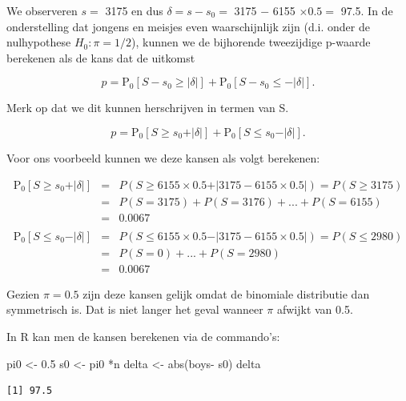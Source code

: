 \documentclass[
  dutch,
  letterpaper,
  12pt]{book}
\newenvironment{Shaded}{\begin{snugshade}}{\end{snugshade}}
\newcommand{\FloatTok}[1]{\textcolor[rgb]{0.68,0.00,0.00}{#1}}
\newcommand{\FunctionTok}[1]{\textcolor[rgb]{0.28,0.35,0.67}{#1}}
\newcommand{\NormalTok}[1]{\textcolor[rgb]{0.00,0.23,0.31}{#1}}
\newcommand{\OtherTok}[1]{\textcolor[rgb]{0.00,0.23,0.31}{#1}}
\newcommand{\SpecialCharTok}[1]{\textcolor[rgb]{0.37,0.37,0.37}{#1}}
\theoremstyle{definition}
\theoremstyle{definition}
\theoremstyle{definition}
\theoremstyle{remark}
\begin{document}
We observeren \(s=\) 3175 en dus \(\delta=s-s_0=\) 3175 \(-\) 6155
\(\times 0.5=\) 97.5. In de onderstelling dat jongens en meisjes even
waarschijnlijk zijn (d.i. onder de nulhypothese \(H_0:\pi=1/2\)), kunnen
we de bijhorende tweezijdige p-waarde berekenen als de kans dat de
uitkomst

\[p=\text{P}_0\left[S-s_0\geq \vert \delta\vert \right] + \text{P}_0\left[S-s_0\leq - \vert \delta\vert \right].\]

Merk op dat we dit kunnen herschrijven in termen van S.

\[p=\text{P}_0\left[S\geq s_0+ \vert \delta\vert \right] + \text{P}_0\left[S \leq s_0 - \vert \delta\vert \right].\]

Voor ons voorbeeld kunnen we deze kansen als volgt berekenen:

\begin{eqnarray*}
\text{P}_0\left[S\geq s_0+ \vert \delta\vert \right] &=& P(S \geq 6155 \times 0.5 + \vert 3175 - 6155 \times 0.5\vert ) = P(S \geq 3175)\\
&= &P(S= 3175) + P(S=3176) + ... + P(S=6155)\\
& =& 0.0067\\\\
\text{P}_0\left[S \leq s_0 - \vert \delta\vert \right] &=& P(S \leq  6155 \times 0.5 - \vert 3175- 6155 \times 0.5\vert) = P(S \leq 2980)\\ &= &P(S=0) + ... + P(S=2980) \\
&=&0.0067
\end{eqnarray*}

Gezien \(\pi=0.5\) zijn deze kansen gelijk omdat de binomiale
distributie dan symmetrisch is. Dat is niet langer het geval wanneer
\(\pi\) afwijkt van 0.5.

In R kan men de kansen berekenen via de commando's:

\begin{Shaded}
\begin{Highlighting}[]
\NormalTok{pi0 }\OtherTok{\textless{}{-}} \FloatTok{0.5}
\NormalTok{s0 }\OtherTok{\textless{}{-}}\NormalTok{ pi0 }\SpecialCharTok{*}\NormalTok{n}
\NormalTok{delta }\OtherTok{\textless{}{-}} \FunctionTok{abs}\NormalTok{(boys}\SpecialCharTok{{-}}\NormalTok{ s0)}
\NormalTok{delta}
\end{Highlighting}
\end{Shaded}

\begin{verbatim}
[1] 97.5
\end{verbatim}
\end{document}
